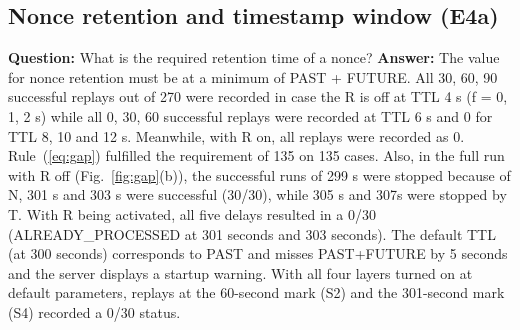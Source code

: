 \documentclass[conference]{IEEEtran}
\begin{document}
\subsection{Nonce retention and timestamp window (E4a)}
\textbf{Question:} What is the required retention time of a nonce? 
\textbf{Answer:} The value for nonce retention must be at a minimum of PAST + FUTURE. All 30, 60, 90 successful replays out of 270 were recorded in case the R is off at TTL 4 s (f = 0, 1, 2 s) while all 0, 30, 60 successful replays were recorded at TTL 6 s and 0 for TTL 8, 10 and 12 s. Meanwhile, with R on, all replays were recorded as 0. Rule~(\ref{eq:gap}) fulfilled the requirement of 135 on 135 cases. Also, in the full run with R off (Fig.~\ref{fig:gap}(b)), the successful runs of 299 s were stopped because of N, 301 s and 303 s were successful (30/30), while 305 s and 307s were stopped by T. With R being activated, all five delays resulted in a 0/30 (ALREADY\_PROCESSED at 301 seconds and 303 seconds). The default TTL (at 300 seconds) corresponds to PAST and misses PAST+FUTURE by 5 seconds and the server displays a startup warning. With all four layers turned on at default parameters, replays at the 60-second mark (S2) and the 301-second mark (S4) recorded a 0/30 status.
\end{document}
